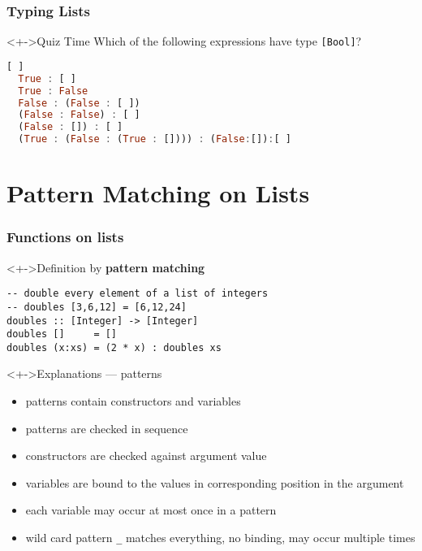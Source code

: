 \documentclass{beamer}
\begin{document}
\begin{frame}[fragile]
  \frametitle{Typing Lists}
\begin{alertblock}<+->{Quiz Time}
    Which of the following expressions have type \lstinline{[Bool]}?
\begin{lstlisting}[language=Haskell]
  [ ]
  True : [ ]
  True : False
  False : (False : [ ])
  (False : False) : [ ]
  (False : []) : [ ]
  (True : (False : (True : []))) : (False:[]):[ ]
\end{lstlisting}
  \end{alertblock}
\end{frame}
\section{Pattern Matching on Lists}
\begin{frame}[fragile]
  \frametitle{Functions on lists}
  \begin{block}<+->{Definition by \textbf{pattern matching}}
\begin{lstlisting}
-- double every element of a list of integers
-- doubles [3,6,12] = [6,12,24]
doubles :: [Integer] -> [Integer]
doubles []     = []
doubles (x:xs) = (2 * x) : doubles xs
\end{lstlisting}
  \end{block}
  \begin{alertblock}<+->{Explanations --- patterns}
    \footnotesize{}
    \begin{itemize}
    \item patterns contain constructors and variables
    \item patterns are checked in sequence
    \item constructors are checked against argument value
    \item variables are bound to the values in
      corresponding position in the argument
    \item each variable may occur at most once in a pattern
    \item wild card pattern \verb!_! matches everything, no binding, may occur multiple times
    \end{itemize}
  \end{alertblock}

  \end{frame}
\end{document}
